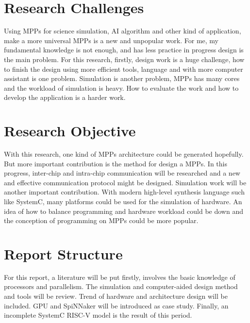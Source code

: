 \section{Research Challenges}
Using MPPs for science simulation, AI algorithm and other kind of application, make a more universal MPPs is a new and unpopular work. For me, my fundamental knowledge is not enough, and has less practice in progress design is the main problem.
For this research, firstly, design work is a huge challenge, how to finish the design using more efficient tools, language and with more computer assistant is one problem. Simulation is another problem, MPPs has many cores and the workload of simulation is heavy. How to evaluate the work and how to develop the application is a harder work. 

\section{Research Objective}
With this research, one kind of MPPs architecture could be generated hopefully. But more important contribution is the method for design a MPPs. In this progress, inter-chip and intra-chip communication will be researched and a new and effective communication protocol might be designed. Simulation work will be another important contribution. With modern high-level synthesis language such like SystemC, many platforms could be used for the simulation of hardware. An idea of how to balance programming and hardware workload could be down and the conception of programming on MPPs could be more popular.

\section{Report Structure}
For this report, a literature will be put firstly, involves the basic knowledge of processors and parallelism. The simulation and computer-aided design method and tools will be review. Trend of hardware and architecture design will be included. GPU and SpiNNaker will be introduced as case study. Finally, an incomplete SystemC RISC-V model is the result of this period. 
